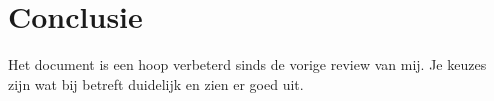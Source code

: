 \documentclass[a4paper]{article}
\begin{document}
\section{Conclusie}
Het document is een hoop verbeterd sinds de vorige review van mij. Je keuzes zijn wat bij betreft duidelijk en zien er goed uit.

% 
% 

\end{document}
